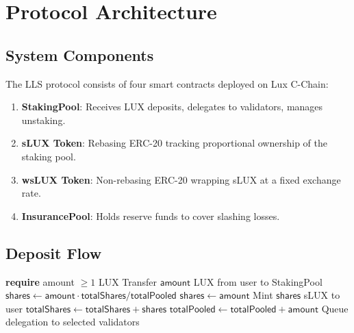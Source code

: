 \section{Protocol Architecture}
\label{sec:architecture}

\subsection{System Components}

The LLS protocol consists of four smart contracts deployed on Lux C-Chain:

\begin{definition}
\begin{enumerate}
    \item \textbf{StakingPool}: Receives LUX deposits, delegates to validators, manages unstaking.
    \item \textbf{sLUX Token}: Rebasing ERC-20 tracking proportional ownership of the staking pool.
    \item \textbf{wsLUX Token}: Non-rebasing ERC-20 wrapping sLUX at a fixed exchange rate.
    \item \textbf{InsurancePool}: Holds reserve funds to cover slashing losses.
\end{enumerate}
\end{definition}

\subsection{Deposit Flow}

\begin{algorithm}[H]
\caption{LUX Deposit and sLUX Minting}
\label{alg:deposit}
\begin{algorithmic}[1]
    \State \textbf{require} amount $\geq 1$ LUX
    \State Transfer $\mathsf{amount}$ LUX from user to StakingPool
    \State $\mathsf{shares} \gets \mathsf{amount} \cdot \mathsf{totalShares} / \mathsf{totalPooled}$
        \State $\mathsf{shares} \gets \mathsf{amount}$ 
    \EndIf
    \State Mint $\mathsf{shares}$ sLUX to user
    \State $\mathsf{totalShares} \gets \mathsf{totalShares} + \mathsf{shares}$
    \State $\mathsf{totalPooled} \gets \mathsf{totalPooled} + \mathsf{amount}$
    \State Queue delegation to selected validators
\EndProcedure
\end{algorithmic}
\end{algorithm}

